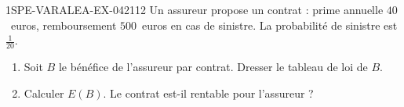 \begin{exercice}{1SPE-VARALEA-EX-042}{1}{12}
Un assureur propose un contrat : prime annuelle $40$~euros, remboursement $500$~euros en cas de sinistre. La probabilité de sinistre est $\frac{1}{20}$.

\begin{enumerate}
  \item Soit $B$ le bénéfice de l'assureur par contrat. Dresser le tableau de loi de $B$.
  \item Calculer $E(B)$. Le contrat est-il rentable pour l'assureur ?
\end{enumerate}
\end{exercice}
